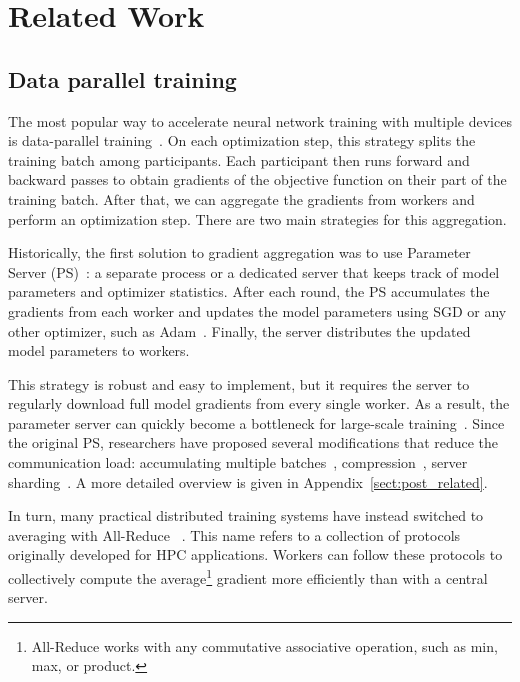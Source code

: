 \vspace{-10px}%
\section{Related Work}\label{sect:related}
\vspace{-4px}
\subsection{Data parallel training}\label{sect:related_data_parallel}
\vspace{-4px}

The most popular way to accelerate neural network training with multiple devices is data-parallel training~\cite{valiant1990bridging,goyal2017accurate,You2020Large}. On each optimization step, this strategy splits the training batch among participants. Each participant then runs forward and backward passes to obtain gradients of the objective function on their part of the training batch. After that, we can aggregate the gradients from workers and perform an optimization step. There are two main strategies for this aggregation.

Historically, the first solution to gradient aggregation was to use Parameter Server (PS)~\cite{parameter_server_first}: a separate process or a dedicated server that keeps track of model parameters and optimizer statistics. After each round, the PS accumulates the gradients from each worker and updates the model parameters using SGD or any other optimizer, such as Adam~\cite{adam}. Finally, the server distributes the updated model parameters to workers.

This strategy is robust and easy to implement, but it requires the server to regularly download full model gradients from every single worker. As a result, the parameter server can quickly become a bottleneck for large-scale training~\cite{survey_distributed2}\nocite{survey_distributed}. Since the original PS, researchers have proposed several modifications that reduce the communication load: accumulating multiple batches~\cite{localsgd_first}, compression~\cite{lin2018deep,pmlr-v97-koloskova19a}, server sharding~\cite{sharded_ps_first,byteps}. A more detailed overview is given in Appendix~\ref{sect:post_related}.

In turn, many practical distributed training systems have instead switched to averaging with All-Reduce ~\cite{goyal2017accurate,mikami2019massively,shoeybi2019megatron,You2020Large}. This name refers to a collection of protocols originally developed for HPC applications. Workers can follow these protocols to collectively compute the average\footnote{All-Reduce works with any commutative associative operation, such as min, max, or product.} gradient more efficiently than with a central server.

